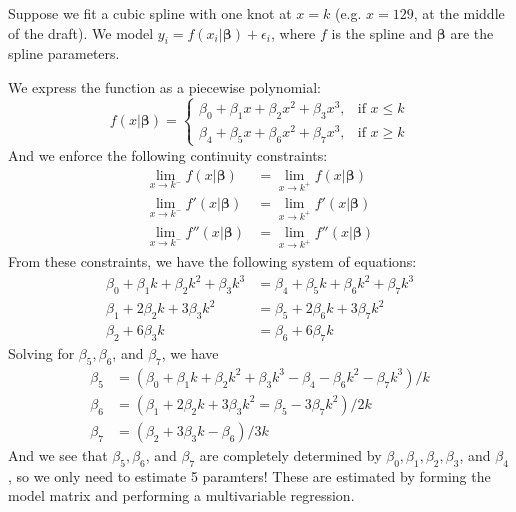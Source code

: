 \documentclass[twoside]{article}
\theoremstyle{definition}
\begin{document}
Suppose we fit a cubic spline with one knot at $x = k$ (e.g. $x = 129$, at the middle of the draft). We model $y_i = f(x_i | \boldsymbol{\beta}) + \epsilon_i$, where $f$ is the spline and $\boldsymbol{\beta}$ are the spline parameters.

We express the function as a piecewise polynomial:
\begin{equation}
    f(x | \boldsymbol{\beta}) = \begin{cases}
        \beta_0 + \beta_1 x + \beta_2 x^2 + \beta_3 x^3, & \text{if } x \leq k \\
        \beta_4 + \beta_5 x + \beta_6 x^2 + \beta_7 x^3, & \text{if } x \geq k
    \end{cases}
\end{equation}
And we enforce the following continuity constraints:
\begin{align*}
    \lim_{x \to k^-} f(x | \boldsymbol{\beta}) &= \lim_{x \to k^+} f(x | \boldsymbol{\beta}) \\
    \lim_{x \to k^-} f'(x | \boldsymbol{\beta}) &= \lim_{x \to k^+} f'(x | \boldsymbol{\beta}) \\
    \lim_{x \to k^-} f''(x | \boldsymbol{\beta}) &= \lim_{x \to k^+} f''(x | \boldsymbol{\beta})
\end{align*}
From these constraints, we have the following system of equations:
\begin{align*}
    \beta_0 + \beta_1 k + \beta_2 k^2 + \beta_3 k^3 &= \beta_4 + \beta_5 k + \beta_6 k^2 + \beta_7 k^3 \\
    \beta_1 + 2\beta_2 k + 3\beta_3 k^2 &= \beta_5 + 2\beta_6 k + 3\beta_7 k^2 \\
    \beta_2 + 6\beta_3 k &= \beta_6 + 6\beta_7 k
\end{align*}
Solving for $\beta_5, \beta_6$, and $\beta_7$, we have
\begin{align*}
    \beta_5 &= (\beta_0 + \beta_1 k + \beta_2 k^2 + \beta_3 k^3 - \beta_4 - \beta_6 k^2 - \beta_7 k^3) / k \\
    \beta_6 &= (\beta_1 + 2 \beta_2 k + 3 \beta_3 k^2 = \beta_5 - 3\beta_7 k^2) / 2k \\
    \beta_7 &= (\beta_2 + 3 \beta_3 k - \beta_6) / 3k
\end{align*}
And we see that $\beta_5, \beta_6$, and $\beta_7$ are completely determined by $\beta_0, \beta_1, \beta_2, \beta_3$, and $\beta_4$, so we only need to estimate 5 paramters! These are estimated by forming the model matrix and performing a multivariable regression.
\end{document}

